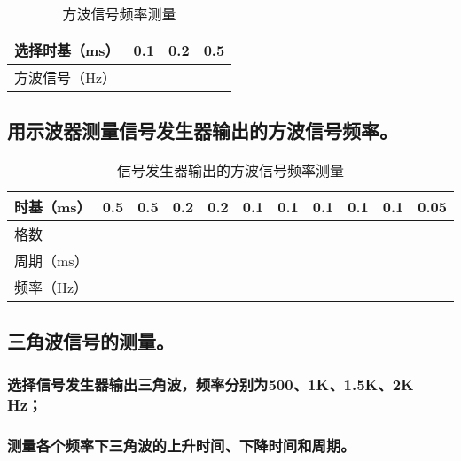 \documentclass{ctexart}
\begin{document}
\begin{table}[h]
    \centering
    \caption{方波信号频率测量}
    \label{tab:self}
    \begin{tabular}{|m{3cm}<{\centering}|m{2cm}<{\centering}|m{2cm}<{\centering}|m{2cm}<{\centering}|}
        \hline
        选择时基（ms）&0.1&0.2&0.5\\
        \hline
        方波信号（Hz）& & & \\
        \hline
    \end{tabular}
\end{table}

\subsection{用示波器测量信号发生器输出的方波信号频率。}

\begin{table}[h]
    \centering
    \caption{信号发生器输出的方波信号频率测量}
    \label{tab:self_1}
    \begin{tabular}{|m{2cm}<{\centering}|c|c|c|c|c|c|c|c|c|c|}
        \hline
        时基（ms）&0.5&0.5&0.2&0.2& 0.1& 0.1 & 0.1 & 0.1 & 0.1 & 0.05 \\
        \hline
        格数 & & & & & & & & & & \\
        \hline
        周期（ms） & & & & & & & & & & \\
        \hline
        频率（Hz）& & & & & & & & & & \\
        \hline
    \end{tabular}
\end{table}

\subsection{三角波信号的测量。}

\subsubsection{选择信号发生器输出三角波，频率分别为500、1K、1.5K、2K Hz；}
\subsubsection{测量各个频率下三角波的上升时间、下降时间和周期。}
\end{document}
